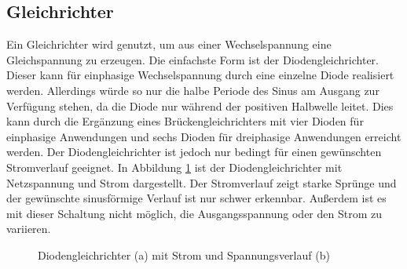		\subsection{Gleichrichter}
		\label{sec:Rec}
		Ein Gleichrichter wird genutzt, um aus einer Wechselspannung eine Gleichspannung zu erzeugen. Die einfachste Form ist der Diodengleichrichter. Dieser kann für einphasige Wechselspannung durch eine einzelne Diode realisiert werden. Allerdings würde so nur die halbe Periode des Sinus am Ausgang zur Verfügung stehen, da die Diode nur während der positiven Halbwelle leitet. Dies kann durch die Ergänzung eines Brückengleichrichters mit vier Dioden für einphasige Anwendungen und sechs Dioden für dreiphasige Anwendungen erreicht werden.
		Der Diodengleichrichter ist jedoch nur bedingt für einen gewünschten Stromverlauf geeignet. In Abbildung \ref{fig:B6DiodRect} ist der Diodengleichrichter mit Netzspannung und Strom dargestellt. Der Stromverlauf zeigt starke Sprünge und der gewünschte sinusförmige Verlauf ist nur schwer erkennbar. Außerdem ist es mit dieser Schaltung nicht möglich, die Ausgangsspannung oder den Strom zu variieren.
		\begin{figure}
			\centering
			\qquad
			\caption{Diodengleichrichter (a) mit Strom und Spannungsverlauf (b)}
			\label{fig:B6DiodRect}
		\end{figure}
		
